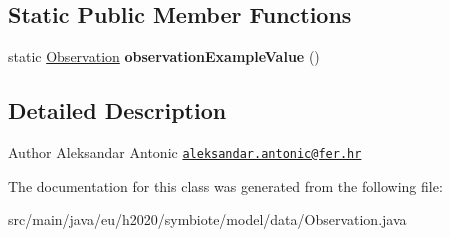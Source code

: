 \subsection*{Static Public Member Functions}
\begin{DoxyCompactItemize}
\item 
\mbox{\label{classeu_1_1h2020_1_1symbiote_1_1model_1_1data_1_1Observation_a6c4f9ce271ecbf36a81a90269c892803}} 
static \hyperlink{classeu_1_1h2020_1_1symbiote_1_1model_1_1data_1_1Observation}{Observation} {\bfseries observation\+Example\+Value} ()
\end{DoxyCompactItemize}


\subsection{Detailed Description}
\begin{DoxyAuthor}{Author}
Aleksandar Antonic \href{mailto:aleksandar.antonic@fer.hr}{\tt aleksandar.\+antonic@fer.\+hr} 
\end{DoxyAuthor}


The documentation for this class was generated from the following file\+:\begin{DoxyCompactItemize}
\item 
src/main/java/eu/h2020/symbiote/model/data/Observation.\+java\end{DoxyCompactItemize}
